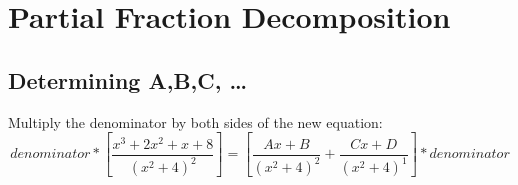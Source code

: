 \section{Partial Fraction Decomposition}
%
%
%
%
%
%
%
%
%
%
%
\subsection{Determining A,B,C, \dots}


Multiply the denominator by both sides of the new equation:
\[ {denominator}*\left[\frac{x^3+2x^2+x+8}{(x^2+4)^2}\right]=\left[\frac{Ax+B}{(x^2+4)^2}+\frac{Cx+D}{(x^2+4)^1}\right]*{denominator} \]

